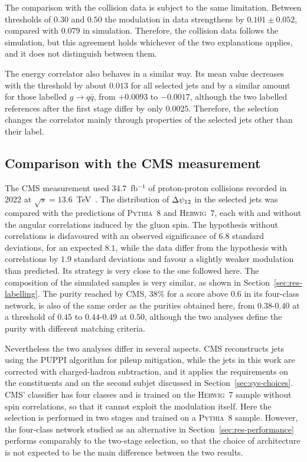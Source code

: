 The comparison with the collision data is subject to the same limitation. Between thresholds of
$0.30$ and $0.50$ the modulation in data strengthens by $0.101 \pm 0.052$,
compared with $0.079$ in simulation. Therefore, the collision data follows the simulation,
but this agreement holds whichever of the two
explanations applies, and it does not distinguish between them.

The energy correlator also behaves in a similar way. Its mean value decreases with the
threshold by about $0.013$ for all selected jets and by a similar amount for those
labelled $g \to q\bar{q}$, from $+0.0093$ to $-0.0017$, although the two labelled
references after the first stage differ by only $0.0025$. Therefore,
the selection changes the correlator
mainly through properties of the selected jets other than their label.

\subsection{Comparison with the CMS measurement}
\label{sec:disc-cms}

The CMS measurement used $34.7$~fb$^{-1}$ of proton-proton collisions recorded in
2022 at $\sqrt{s} = 13.6$~TeV~\cite{CMS:2026jnt}. The distribution of $\Delta\psi_{12}$ in
the selected jets was compared with the predictions of \textsc{Pythia}~8 and
\textsc{Herwig}~7, each with and without the angular correlations induced by the
gluon spin. The hypothesis without correlations is disfavoured with an observed
significance of $6.8$ standard deviations, for an expected $8.1$, while the data
differ from the hypothesis with correlations by $1.9$ standard deviations and
favour a slightly weaker modulation than predicted. Its strategy is very close to the
one followed here.
The composition of the simulated samples is very similar, as shown in
Section~\ref{sec:res-labelling}. The purity reached by CMS, $38\%$ for a score
above $0.6$ in its four-class network, is also of the same order as the purities
obtained here, from $0.38$-$0.40$ at a threshold of $0.45$ to $0.44$-$0.49$ at
$0.50$, although the two analyses define the purity with different matching
criteria.

Nevertheless the two analyses differ in several aspects. CMS reconstructs jets
using the PUPPI algorithm for pileup mitigation, while the jets in this work 
are corrected with charged-hadron subtraction, and it applies the requirements on
the constituents and on the second subjet discussed in
Section~\ref{sec:sys-choices}. CMS' classifier has four classes and is trained on
the \textsc{Herwig}~7 sample without spin correlations, so that it cannot exploit
the modulation itself. Here the selection is performed in two stages and trained
on a \textsc{Pythia}~8 sample. However, the four-class network studied as an
alternative in Section~\ref{sec:res-performance} performs comparably to the
two-stage selection, so that the choice of architecture is not expected to be the
main difference between the two results.

